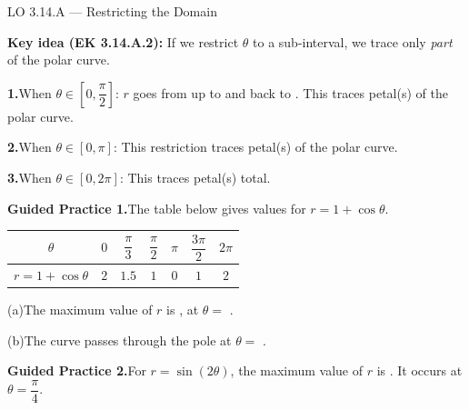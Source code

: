 \documentclass[10pt]{article}
\begin{document}
\begin{notesbox}{LO 3.14.A --- Restricting the Domain}

\textbf{Key idea (EK 3.14.A.2):} If we restrict $\theta$ to a sub-interval, we trace
only \emph{part} of the polar curve.

\vspace{6pt}
\textbf{1.}\quad When $\theta \in \left[0, \dfrac{\pi}{2}\right]$:
$r$ goes from  up to  and back to .
This traces  petal(s) of the polar curve.

\vspace{4pt}
\textbf{2.}\quad When $\theta \in [0, \pi]$:
This restriction traces  petal(s) of the polar curve.

\vspace{4pt}
\textbf{3.}\quad When $\theta \in [0, 2\pi]$:
This traces  petal(s) total.

\end{notesbox}

\vspace{0.08in}

\begin{practicebox}

\textbf{Guided Practice 1.}\quad The table below gives values for $r = 1 + \cos\theta$.

\vspace{4pt}
\renewcommand{\arraystretch}{1.5}
\begin{tabular}{|c|c|c|c|c|c|c|}
\hline
$\theta$ & $0$ & $\dfrac{\pi}{3}$ & $\dfrac{\pi}{2}$ & $\pi$ & $\dfrac{3\pi}{2}$ & $2\pi$ \\
\hline
$r = 1 + \cos\theta$ & $2$ & $1.5$ & $1$ & $0$ & $1$ & $2$ \\
\hline
\end{tabular}

\vspace{6pt}
(a)\quad The maximum value of $r$ is , at $\theta = $ .

\vspace{4pt}
(b)\quad The curve passes through the pole at $\theta = $ \ans{$\pi$}.

\vspace{0.10in}
\textbf{Guided Practice 2.}\quad For $r = \sin(2\theta)$, the maximum value of $r$ is
. It occurs at $\theta = \dfrac{\pi}{4}$.

\end{practicebox}
\end{document}
